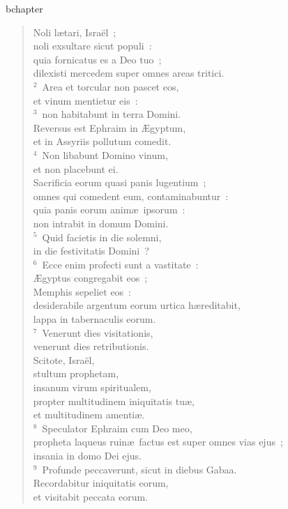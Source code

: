 bchapter\begin{verse}\vspace{-19pt}Noli l\ae tari, Isra\"el~;\\ noli exsultare sicut populi~:\\ quia fornicatus es a Deo tuo~;\\ dilexisti mercedem super omnes areas tritici.\\
${}^{2}$~Area et torcular non pascet eos,\\ et vinum mentietur eis~:\\
${}^{3}$~non habitabunt in terra Domini.\\ Reversus est Ephraim in \AE gyptum,\\ et in Assyriis pollutum comedit.\\
${}^{4}$~Non libabunt Domino vinum,\\ et non placebunt ei.\\ Sacrificia eorum quasi panis lugentium~;\\ omnes qui comedent eum, contaminabuntur~:\\ quia panis eorum anim\ae\ ipsorum~:\\ non intrabit in domum Domini.\\
${}^{5}$~Quid facietis in die solemni,\\ in die festivitatis Domini~?\\
${}^{6}$~Ecce enim profecti sunt a vastitate~:\\ \AE gyptus congregabit eos~;\\ Memphis sepeliet eos~:\\ desiderabile argentum eorum urtica h\ae reditabit,\\ lappa in tabernaculis eorum.\\
${}^{7}$~Venerunt dies visitationis,\\ venerunt dies retributionis.\\ Scitote, Isra\"el,\\ stultum prophetam,\\ insanum virum spiritualem,\\ propter multitudinem iniquitatis tu\ae ,\\ et multitudinem amenti\ae .\\
${}^{8}$~Speculator Ephraim cum Deo meo,\\ propheta laqueus ruin\ae\ factus est super omnes vias ejus~;\\ insania in domo Dei ejus.\\
${}^{9}$~Profunde peccaverunt, sicut in diebus Gabaa.\\ Recordabitur iniquitatis eorum,\\ et visitabit peccata eorum.\\

\end{verse}
